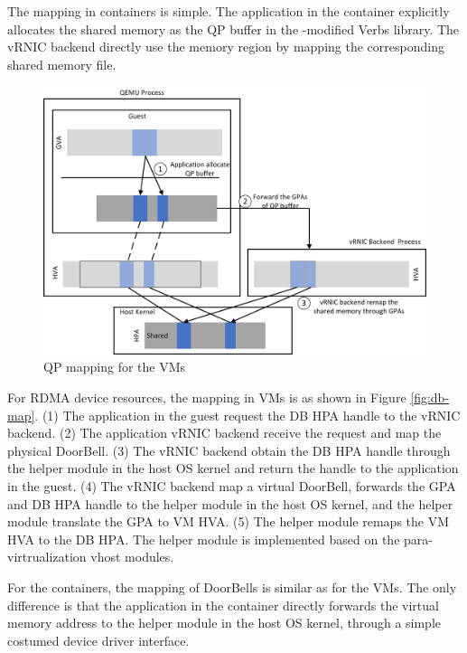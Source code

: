 The mapping in containers is simple. The application in the container explicitly allocates the shared memory as the QP buffer in the \sys-modified Verbs library. The vRNIC backend directly use the memory region by mapping the corresponding shared memory file.

\begin{figure}[!ht]
	\centering
	\includegraphics[width=1\linewidth]{images/qp-map.png}
	\caption{QP mapping for the VMs}
	\label{fig:qp-map}
\end{figure}

For RDMA device resources, the mapping in VMs is as shown in Figure \ref{fig:db-map}. (1) The application in the guest request the DB HPA handle to the vRNIC backend. (2) The application vRNIC backend receive the request and map the physical DoorBell. (3) The vRNIC backend obtain the DB HPA handle through the helper module in the host OS kernel and return the handle to the application in the guest. (4) The vRNIC backend map a virtual DoorBell, forwards the GPA and DB HPA handle to the helper module in the host OS kernel, and the helper module translate the GPA to VM HVA. (5) The helper module remaps the VM HVA to the DB HPA. The helper module is implemented based on the para-virtrualization vhost modules.

For the containers, the mapping of DoorBells is similar as for the VMs. The only difference is that the application in the container directly forwards the virtual memory address to the helper module in the host OS kernel, through a simple costumed device driver interface.

